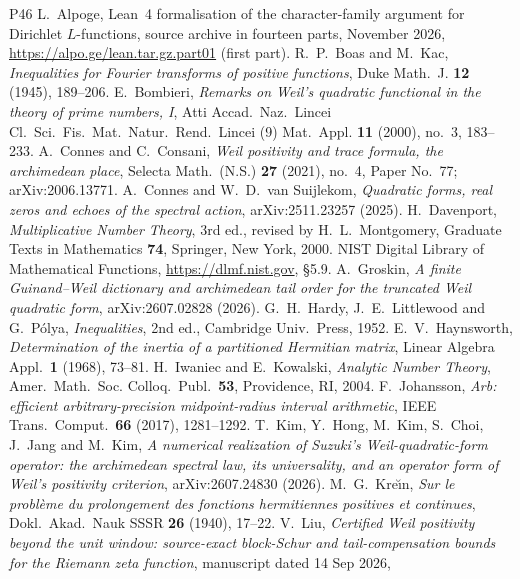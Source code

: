 \documentclass[10pt]{amsart}
\theoremstyle{definition}
\theoremstyle{remark}
\begin{document}
\begin{thebibliography}{P46}
 L.~Alpoge, Lean~4 formalisation of the character-family argument
for Dirichlet $L$-functions, source archive in fourteen parts, November 2026,
\url{https://alpo.ge/lean.tar.gz.part01} (first part).
 R.~P.~Boas and M.~Kac, \emph{Inequalities for Fourier transforms of positive
functions}, Duke Math.~J. \textbf{12} (1945), 189--206.
 E.~Bombieri, \emph{Remarks on Weil's quadratic functional in the theory of
prime numbers, I}, Atti Accad.~Naz.~Lincei Cl.~Sci.~Fis.~Mat.~Natur.~Rend.~Lincei (9) Mat.~Appl.
\textbf{11} (2000), no.~3, 183--233.
 A.~Connes and C.~Consani, \emph{Weil positivity and trace formula, the archimedean place}, Selecta Math.\ (N.S.) \textbf{27} (2021), no.~4, Paper No.~77; arXiv:2006.13771.
 A.~Connes and W.~D.~van Suijlekom, \emph{Quadratic forms, real zeros and echoes of the spectral action}, arXiv:2511.23257 (2025).
 H.~Davenport, \emph{Multiplicative Number Theory}, 3rd ed., revised by
H.~L.~Montgomery, Graduate Texts in Mathematics \textbf{74}, Springer, New York, 2000.
 NIST Digital Library of Mathematical Functions, \url{https://dlmf.nist.gov}, \S5.9.
 A.~Groskin, \emph{A finite Guinand--Weil dictionary and archimedean tail
order for the truncated Weil quadratic form}, arXiv:2607.02828 (2026).
 G.~H.~Hardy, J.~E.~Littlewood and G.~P\'olya, \emph{Inequalities}, 2nd ed., Cambridge Univ.~Press, 1952.
 E.~V.~Haynsworth, \emph{Determination of the inertia of a partitioned Hermitian
matrix}, Linear Algebra Appl.\ \textbf{1} (1968), 73--81.
 H.~Iwaniec and E.~Kowalski, \emph{Analytic Number Theory}, Amer.\ Math.\ Soc.
Colloq.\ Publ.\ \textbf{53}, Providence, RI, 2004.
 F.~Johansson, \emph{Arb: efficient arbitrary-precision midpoint-radius interval
arithmetic}, IEEE Trans.\ Comput.\ \textbf{66} (2017), 1281--1292.
 T.~Kim, Y.~Hong, M.~Kim, S.~Choi, J.~Jang and M.~Kim, \emph{A numerical realization of Suzuki's Weil-quadratic-form operator: the archimedean spectral law, its universality, and an operator form of Weil's positivity criterion}, arXiv:2607.24830 (2026).
 M.~G.~Kre\u{\i}n, \emph{Sur le probl\`eme du prolongement des fonctions
hermitiennes positives et continues}, Dokl.~Akad.~Nauk SSSR \textbf{26} (1940), 17--22.
 V.~Liu, \emph{Certified Weil positivity beyond the unit window: source-exact
block-Schur and tail-compensation bounds for the Riemann zeta function}, manuscript dated 14 Sep 2026,

\end{thebibliography}
\end{document}
